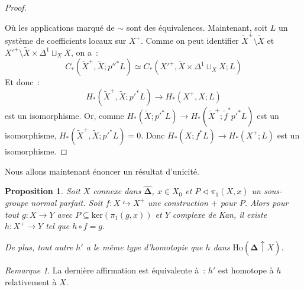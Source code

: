 \documentclass{amsart}
\theoremstyle{plain}
\newtheorem{prop}[theo]{Proposition}
\theoremstyle{definition}
\theoremstyle{remark}
\newtheorem{rem}[theo]{Remarque}
\newcommand{\DEns}{\widehat{\mathbf{\Delta}}}
\newcommand{\Ho}[1]{\mathrm{Ho}({#1})}
\newcommand{\ra}{\rightarrow}
\newcommand{\lra}{\longrightarrow}
\newcommand{\myker}[1]{\mathrm{ker}({#1})}
\begin{document}
\begin{proof}
\begin{center}
\begin{tikzcd}[column sep = large, row sep = large]
    \end{tikzcd}
  \end{center}
  Où les applications marqué de $\sim$ sont des équivalences.
  Maintenant, soit $L$ un système de coefficients locaux sur $X^+$. Comme on peut identifier $\tilde{X}^+\setminus \tilde{X}$
  et $X'^+\setminus \tilde{X}\times\Delta^1\sqcup_{X}X$, on a~:
  $$C_*(\tilde{X}^+,\tilde{X};p''^*L)\simeq C_*(X'^+, \tilde{X}\times\Delta^1\sqcup_{X}X;L)$$
  Et donc~: $$H_*(\tilde{X}^+,\tilde{X};p'^*L)\lra H_*(X^+,X;L)$$ est un isomorphisme.
  Or, comme $H_*(\tilde{X};p'^*L)\ra H_*(\tilde{X}^+;\tilde{f}^*p'^*L)$ est un isomorphisme, $H_*(\tilde{X}^+,\tilde{X};p'^*L)=0$.
  Donc $H_*(X;f^*L)\ra H_*(X^+;L)$ est un isomorphisme.
\end{proof}

Nous allons maintenant énoncer un résultat d'unicité.

\begin{prop}
  Soit $X$ connexe dans $\DEns$, $x\in X_0$ et $P\triangleleft \pi_1(X,x)$ un sous-groupe normal parfait. Soit $f:X\hookrightarrow X^+$ une construction $+$
  pour $P$. Alors pour tout $g:X\ra Y$ avec $P\subseteq \myker{\pi_1(g,x)}$ et $Y$ complexe de Kan, il existe $h:X^+\ra Y$ tel que $h\circ f=g$.
  \begin{center}
  \end{center}
  De plus, tout autre $h'$ a le même type d'homotopie que $h$ dans $\Ho{\DEns\uparrow X}$. 
\end{prop}

\begin{rem}
  La dernière affirmation est équivalente à~: $h'$ est homotope à $h$ relativement à $X$. 
\end{rem}
\end{document}

